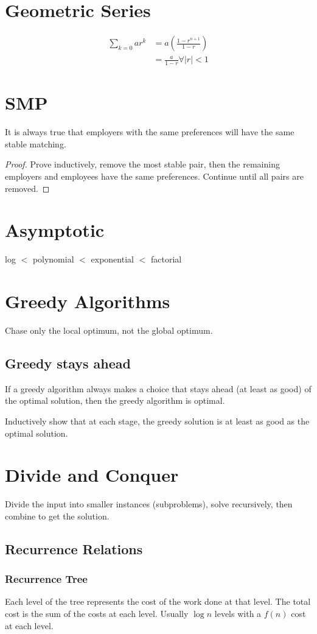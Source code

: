\documentclass[conference]{IEEEtran}
\begin{document}
\section{Geometric Series}
\begin{align*}
    \sum_{k=0}a r^k &= a (\frac{1-r^{n+1}}{1-r})\\
    & = \frac{a}{1-r} \forall |r| < 1
\end{align*}
\section{SMP}
It is always true that employers with the same preferences will have the same stable matching.\begin{proof}
    Prove inductively, remove the most stable pair, then the remaining employers and employees have the same preferences. Continue until all pairs are removed.
\end{proof}
\section{Asymptotic}
log $<$ polynomial $<$ exponential $<$ factorial
\section{Greedy Algorithms}
Chase only the local optimum, not the global optimum.
\subsection{Greedy stays ahead}

    If a greedy algorithm always makes a choice that stays ahead (at least as good) of the optimal solution, then the greedy algorithm is optimal.

    Inductively show that at each stage, the greedy solution is at least as good as the optimal solution.

\section{Divide and Conquer}
Divide the input into smaller instances (subproblems), solve recursively, then combine to get the solution.

\subsection{Recurrence Relations}
\subsubsection{Recurrence Tree}
Each level of the tree represents the cost of the work done at that level. The total cost is the sum of the costs at each level. Usually $\log n$ levels with a $f(n)$ cost at each level.
\end{document}
